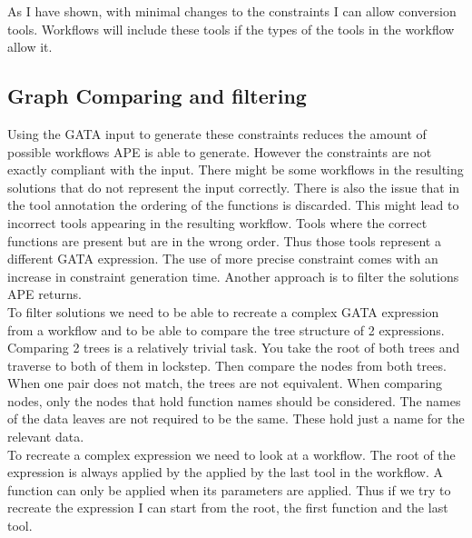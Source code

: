 \documentclass{article}
\begin{document}
As I have shown, with minimal changes to the constraints I can allow conversion tools. Workflows will include these tools if the types of the tools in the workflow allow it.
 
 
 
 


\subsection{Graph Comparing and filtering}
Using the GATA input to generate these constraints reduces the amount of possible workflows APE is able to generate. However the constraints are not exactly compliant with the input. There might be some workflows in the resulting solutions that do not represent the input correctly. There is also the issue that in the tool annotation the ordering of the functions is discarded. This might lead to incorrect tools appearing in the resulting workflow. Tools where the correct functions are present but are in the wrong order. Thus those tools represent a different GATA expression. The use of more precise constraint comes with an increase in constraint generation time. Another approach is to filter the solutions APE returns. 
\\

To filter solutions we need to be able to recreate a complex GATA expression from a workflow and to be able to compare the tree structure of 2 expressions. Comparing 2 trees is a relatively trivial task. You take the root of both trees and traverse to both of them in lockstep. Then compare the nodes from both trees. When one pair does not match, the trees are not equivalent. When comparing nodes, only the nodes that hold function names should be considered. The names of the data leaves are not required to be the same. These hold just a name for the relevant data. \\

To recreate a complex expression we need to look at a workflow. The root of the expression is always applied by the applied by the last tool in the workflow. A function can only be applied when its parameters are applied. Thus if we try to recreate the expression I can start from the root, the first function and the last tool. 
\end{document}
